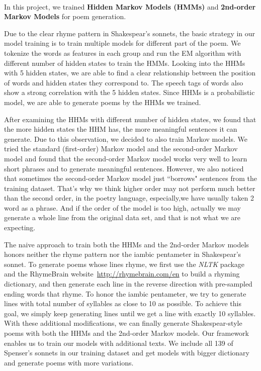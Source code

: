 %
\paragraph{}
In this project, we trained \textbf{Hidden Markov Models (HMMs)} and \textbf{2nd-order Markov Models} for poem generation.

Due to the clear rhyme pattern in Shakespear's sonnets, the basic strategy in our model training is to train multiple models for different part of the poem. We tokenize the words as features in each group and run the EM algorithm with different number of hidden states to train the HMMs. Looking into the HHMs with 5 hidden states, we are able to find a clear relationship between the position of words and hidden states they correspond to. The speech tags of words also show a strong correlation with the 5 hidden states. Since HHMs is a probabilistic model, we are able to generate poems by the HHMs we trained. 

After examining the HHMs with different number of hidden states, we found that the more hidden states the HHM has, the more meaningful sentences it can generate. Due to this observation, we decided to also train Markov models. We tried the standard (first-order) Markov model and the second-order Markov model and found that the second-order Markov model works very well to learn short phrases and to generate meaningful sentences. However, we also noticed that sometimes the second-order Markov model just ``borrows" sentences from the training dataset. That's why we think higher order may not perform much better than the second order, in the poetry language, especially,we have usually taken 2 word as a phrase. And if the order of the model is too high, actually we may generate a whole line from the original data set, and that is not what we are expecting. 

The naive approach to train both the HHMs and the 2nd-order Markov models honors neither the rhyme pattern nor the iambic pentameter in Shakespear's sonnet. To generate poems whose lines rhyme, we first use the \textit{NLTK} package and the RhymeBrain website~\url{http://rhymebrain.com/en} to build a rhyming dictionary, and then generate each line in the reverse direction with pre-sampled ending words that rhyme. To honor the iambic pentameter, we try to generate lines with total number of syllables as close to 10 as possible. To achieve this goal, we simply keep generating lines until we get a line with exactly 10 syllables. With these additional modifications, we can finally generate Shakespear-style poems with both the HHMs and the 2nd-order Markov models. Our framework enables us to train our models with additional texts. We include all 139 of Spenser's sonnets in our training dataset and get models with bigger dictionary and generate poems with more variations. 

